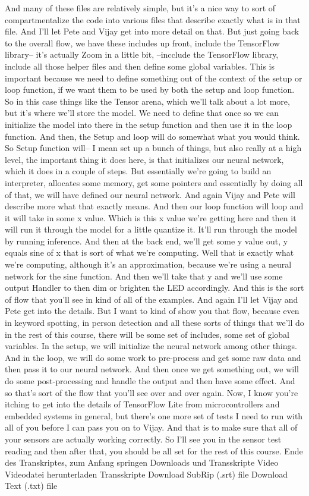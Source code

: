 And many of these files are relatively simple,
but it's a nice way to sort of compartmentalize
the code into various files that describe exactly what is in that file.
And I'll let Pete and Vijay get into more detail on that.
But just going back to the overall flow, we
have these includes up front, include the TensorFlow library--
it's actually Zoom in a little bit, --incclude the TensorFlow library,
include all those helper files and then define some global variables.
This is important because we need to define something out
of the context of the setup or loop function,
if we want them to be used by both the setup and loop function.
So in this case things like the Tensor arena,
which we'll talk about a lot more, but it's where we'll store the model.
We need to define that once so we can initialize
the model into there in the setup function
and then use it in the loop function.
And then, the Setup and loop will do somewhat what you would think.
So Setup function will--
I mean set up a bunch of things, but also really
at a high level, the important thing it does here, is that initializes
our neural network, which it does in a couple of steps.
But essentially we're going to build an interpreter, allocates some memory,
get some pointers and essentially by doing all of that,
we will have defined our neural network.
And again Vijay and Pete will describe more what that exactly means.
And then our loop function will loop and it will take in some x value.
Which is this x value we're getting here and then
it will run it through the model for a little quantize it.
It'll run through the model by running inference.
And then at the back end, we'll get some y value out,
y equals sine of x that is sort of what we're computing.
Well that is exactly what we're computing,
although it's an approximation, because we're using
a neural network for the sine function.
And then we'll take that y and we'll use some output Handler to then
dim or brighten the LED accordingly.
And this is the sort of flow that you'll see in kind of all of the examples.
And again I'll let Vijay and Pete get into the details.
But I want to kind of show you that flow,
because even in keyword spotting, in person detection and all
these sorts of things that we'll do in the rest of this course,
there will be some set of includes, some set of global variables.
In the setup, we will initialize the neural network among other things.
And in the loop, we will do some work to pre-process and get some raw data
and then pass it to our neural network.
And then once we get something out, we will do some post-processing
and handle the output and then have some effect.
And so that's sort of the flow that you'll see over and over again.
Now, I know you're itching to get into the details of TensorFlow
Lite from microcontrollers and embedded systems in general,
but there's one more set of tests I need to run with all of you
before I can pass you on to Vijay.
And that is to make sure that all of your sensors
are actually working correctly.
So I'll see you in the sensor test reading
and then after that, you should be all set for the rest of this course.
Ende des Transkriptes, zum Anfang springen
Downloads und Transskripte
Video
Videodatei herunterladen
Transskripte
Download SubRip (.srt) file
Download Text (.txt) file


